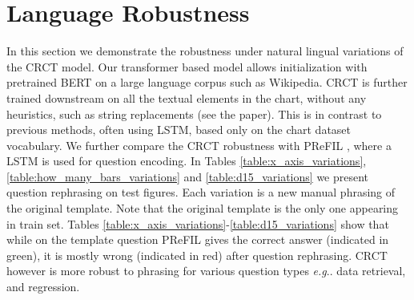 \documentclass[runningheads]{llncs}
\makeatletter
\newcommand\our[1][]{CRCT\xspace}
\DeclareRobustCommand\onedot{\futurelet\@let@token\@onedot}
\def\@onedot{\ifx\@let@token.\else.\null\fi\xspace}
\def\eg{\emph{e.g}\onedot} \def\Eg{\emph{E.g}\onedot}
\makeatother
\begin{document}
\section{Language Robustness}
\label{sec:lang_robust}
In this section we demonstrate the robustness under natural lingual variations of the CRCT model. Our transformer based model allows initialization with pretrained BERT \cite{devlin2019bert} on a large language corpus such as Wikipedia. \our is further trained downstream on all the textual elements in the chart, without any heuristics, such as string replacements (see the paper). This is in contrast to previous methods, often using LSTM, based only on the chart dataset vocabulary. We further compare the CRCT robustness with PReFIL \cite{prefil}, where a LSTM is used for question encoding. In Tables \ref{table:x_axis_variations}, \ref{table:how_many_bars_variations} and \ref{table:d15_variations} we present question rephrasing on test figures. Each variation is a new manual phrasing of the original template. Note that the original template is the only one appearing in train set. Tables \ref{table:x_axis_variations}-\ref{table:d15_variations} show that while on the template question PReFIL gives the correct answer (indicated in green), it is mostly wrong (indicated in red) after question rephrasing. CRCT however is more robust to phrasing for various question types \eg data retrieval, and regression.
\end{document}
